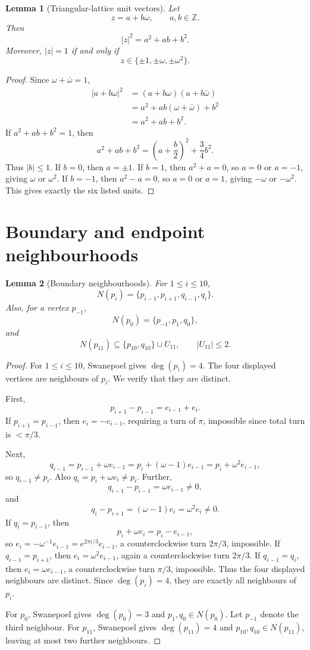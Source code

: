 \documentclass[11pt]{article}
\theoremstyle{plain}
\newtheorem{lemma}{Lemma}
\numberwithin{equation}{section}
\begin{document}
\begin{lemma}[Triangular-lattice unit vectors]\label{lem:lattice-units}
Let
\[
 z=a+b\omega,
 \qquad a,b\in\mathbb Z.
\]
Then
\[
 |z|^2=a^2+ab+b^2.
\]
Moreover, $|z|=1$ if and only if
\[
 z\in\{\pm1,\pm\omega,\pm\omega^2\}.
\]
\end{lemma}

\begin{proof}
Since $\omega+\bar\omega=1$,
\[
\begin{aligned}
 |a+b\omega|^2
 &=(a+b\omega)(a+b\bar\omega)\\
 &=a^2+ab(\omega+\bar\omega)+b^2\\
 &=a^2+ab+b^2.
\end{aligned}
\]
If $a^2+ab+b^2=1$, then
\[
 a^2+ab+b^2=\left(a+\frac b2\right)^2+\frac34 b^2.
\]
Thus $|b|\le1$. If $b=0$, then $a=\pm1$. If $b=1$, then $a^2+a=0$, so $a=0$ or $a=-1$, giving $\omega$ or $\omega^2$. If $b=-1$, then $a^2-a=0$, so $a=0$ or $a=1$, giving $-\omega$ or $-\omega^2$. This gives exactly the six listed units.
\end{proof}

\section{Boundary and endpoint neighbourhoods}

\begin{lemma}[Boundary neighbourhoods]\label{lem:boundary-nbhd}
For $1\le i\le 10$,
\[
 N(p_i)=\{p_{i-1},p_{i+1},q_{i-1},q_i\}.
\]
Also, for a vertex $p_{-1}$,
\[
 N(p_0)=\{p_{-1},p_1,q_0\},
\]
and
\[
 N(p_{11})\subseteq \{p_{10},q_{10}\}\cup U_{11},
 \qquad |U_{11}|\le2.
\]
\end{lemma}

\begin{proof}
For $1\le i\le10$, Swanepoel gives $\deg(p_i)=4$. The four displayed vertices are neighbours of $p_i$. We verify that they are distinct.

First,
\[
 p_{i+1}-p_{i-1}=e_{i-1}+e_i.
\]
If $p_{i+1}=p_{i-1}$, then $e_i=-e_{i-1}$, requiring a turn of $\pi$, impossible since total turn is $<\pi/3$.

Next,
\[
 q_{i-1}=p_{i-1}+\omega e_{i-1}=p_i+(\omega-1)e_{i-1}=p_i+\omega^2e_{i-1},
\]
so $q_{i-1}\ne p_i$. Also $q_i=p_i+\omega e_i\ne p_i$.
Further,
\[
 q_{i-1}-p_{i-1}=\omega e_{i-1}\ne0,
\]
and
\[
 q_i-p_{i+1}=(\omega-1)e_i=\omega^2e_i\ne0.
\]
If $q_i=p_{i-1}$, then
\[
 p_i+\omega e_i=p_i-e_{i-1},
\]
so $e_i=-\omega^{-1}e_{i-1}=e^{2\pi i/3}e_{i-1}$, a counterclockwise turn $2\pi/3$, impossible.
If $q_{i-1}=p_{i+1}$, then $e_i=\omega^2e_{i-1}$, again a counterclockwise turn $2\pi/3$.
If $q_{i-1}=q_i$, then $e_i=\omega e_{i-1}$, a counterclockwise turn $\pi/3$, impossible.
Thus the four displayed neighbours are distinct. Since $\deg(p_i)=4$, they are exactly all neighbours of $p_i$.

For $p_0$, Swanepoel gives $\deg(p_0)=3$ and $p_1,q_0\in N(p_0)$. Let $p_{-1}$ denote the third neighbour. For $p_{11}$, Swanepoel gives $\deg(p_{11})=4$ and $p_{10},q_{10}\in N(p_{11})$, leaving at most two further neighbours.
\end{proof}
\end{document}
